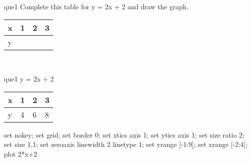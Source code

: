 \documentclass[13.5pt, varwidth=true]{beamer}
\begin{document}
\begin{frame}[shrink=19,fragile]
	\begin{beamercolorbox}[rounded=true, left, shadow=true,wd=14.8cm]{que1}
		 Complete this table for y = 2x + 2 and draw the graph. \\[0.3cm] \renewcommand{\arraystretch}{1.2}\begin{tabular}{|C|C|C|C|} \hline x & 1 & 2 & 3 \\ \hline y & & & \\ \hline \end{tabular}\\[0.3cm]
	\end{beamercolorbox}
\end{frame}
\begin{frame}[shrink=19,fragile]
	\begin{beamercolorbox}[rounded=true, left, shadow=true,wd=14.8cm]{que1}
		y = 2x + 2\renewcommand{\arraystretch}{1.2}\begin{tabular}{|C|C|C|C|} \hline x & 1 & 2 & 3 \\ \hline y & 4 & 6 & 8\\ \hline \end{tabular}\begin{gnuplot}[terminal=pdf] set nokey; set grid; set border 0; set xtics axis 1; set ytics axis 1; set size ratio 2; set size 1,1; set zeroaxis linewidth 2 linetype 1; set yrange [-1:9]; set xrange [-2:4]; plot 2*x+2 \end{gnuplot}
	\end{beamercolorbox}
\end{frame}
\end{document}
